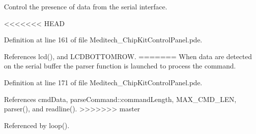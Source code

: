 Control the presence of data from the serial interface. 

<<<<<<< HEAD


Definition at line 161 of file Meditech\-\_\-\-Chip\-Kit\-Control\-Panel.\-pde.



References lcd(), and L\-C\-D\-B\-O\-T\-T\-O\-M\-R\-O\-W.
=======
When data are detected on the serial buffer the parser function is launched to process the command. 

Definition at line 171 of file Meditech\-\_\-\-Chip\-Kit\-Control\-Panel.\-pde.



References cmd\-Data, parse\-Command\-::command\-Length, M\-A\-X\-\_\-\-C\-M\-D\-\_\-\-L\-E\-N, parser(), and readline().
>>>>>>> master



Referenced by loop().


